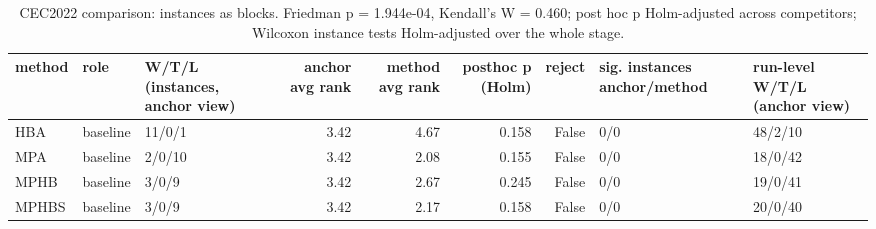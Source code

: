 \begin{table}[t]
\centering
\scriptsize
\caption{CEC2022 comparison: instances as blocks. Friedman p = 1.944e-04, Kendall's W = 0.460; post hoc p Holm-adjusted across competitors; Wilcoxon instance tests Holm-adjusted over the whole stage.}
\label{tab:cec2022_comparison_global}
\begin{tabular}{lllrrrrll}
\toprule
method & role & W/T/L (instances, anchor view) & anchor avg rank & method avg rank & posthoc p (Holm) & reject & sig. instances anchor/method & run-level W/T/L (anchor view) \\
\midrule
HBA & baseline & 11/0/1 & 3.42 & 4.67 & 0.158 & False & 0/0 & 48/2/10 \\
MPA & baseline & 2/0/10 & 3.42 & 2.08 & 0.155 & False & 0/0 & 18/0/42 \\
MPHB & baseline & 3/0/9 & 3.42 & 2.67 & 0.245 & False & 0/0 & 19/0/41 \\
MPHBS & baseline & 3/0/9 & 3.42 & 2.17 & 0.158 & False & 0/0 & 20/0/40 \\
\bottomrule
\end{tabular}
\end{table}
